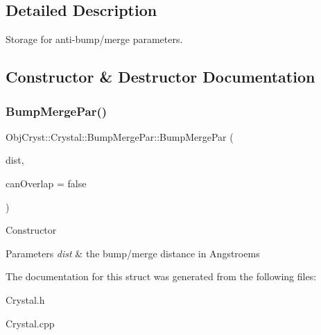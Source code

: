\subsection{Detailed Description}
Storage for anti-\/bump/merge parameters. 

\subsection{Constructor \& Destructor Documentation}
\mbox{\label{struct_obj_cryst_1_1_crystal_1_1_bump_merge_par_ac4da8697127de078e7ef7092c49de0ab}} 
\subsubsection{\texorpdfstring{BumpMergePar()}{BumpMergePar()}}
{\footnotesize\ttfamily Obj\+Cryst\+::\+Crystal\+::\+Bump\+Merge\+Par\+::\+Bump\+Merge\+Par (\begin{DoxyParamCaption}\item[{const R\+E\+AL}]{dist,  }\item[{const bool}]{can\+Overlap = {\ttfamily false} }\end{DoxyParamCaption})}

Constructor


\begin{DoxyParams}{Parameters}
{\em dist} & the bump/merge distance in Angstroems \\
\hline
\end{DoxyParams}


The documentation for this struct was generated from the following files\+:\begin{DoxyCompactItemize}
\item 
Crystal.\+h\item 
Crystal.\+cpp\end{DoxyCompactItemize}
